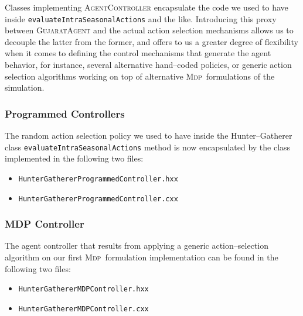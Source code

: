 \documentclass[a4paper,10pt]{article}
\newcommand{\mdp}{\textsc{Mdp}}
\begin{document}
Classes implementing \textsc{AgentController} encapsulate the code we used to have inside \texttt{evaluateIntraSeasonalActions}
and the like. Introducing this proxy between \textsc{GujaratAgent} and the actual action selection mechanisms allows us
to decouple the latter from the former, and offers to us a greater degree of flexibility when it comes to defining
the control mechanisms that generate the agent behavior, for instance, several alternative hand--coded policies, or 
generic action selection algorithms working on top of alternative \mdp~formulations of the simulation.

\subsubsection{Programmed Controllers}

The random action selection policy we used to have inside the Hunter--Gatherer class \texttt{evaluateIntraSeasonalActions}
method is now encapsulated by the class implemented in the following two files:

\begin{itemize}
\item \texttt{HunterGathererProgrammedController.hxx}
\item \texttt{HunterGathererProgrammedController.cxx}
\end{itemize}

\subsubsection{MDP Controller}

The agent controller that results from applying a generic action--selection algorithm on our first \mdp~formulation 
implementation can be found in the following two files:

\begin{itemize}
\item \texttt{HunterGathererMDPController.hxx}
\item \texttt{HunterGathererMDPController.cxx}
\end{itemize}
\end{document}
